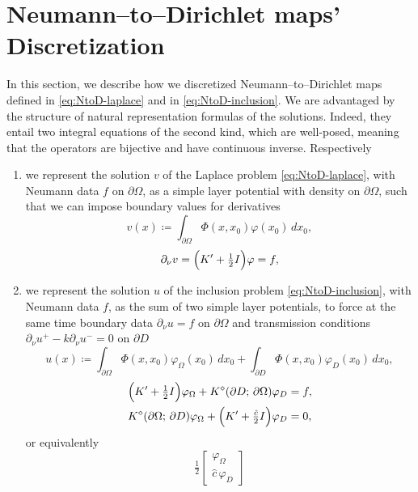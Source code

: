 \documentclass[10pt, a4paper, twoside, openright]{book}
\theoremstyle{definition}
\theoremstyle{plain}
\theoremstyle{plain}
\theoremstyle{plain}
\theoremstyle{plain}
\theoremstyle{plain}
\theoremstyle{plain}
\theoremstyle{plain}
\theoremstyle{plain}
\let\phi\varphi
\begin{document}
\section{Neumann--to--Dirichlet maps' Discretization}
In this section, we describe how we discretized Neumann--to--Dirichlet maps defined in 
\eqref{eq:NtoD-laplace} and in \eqref{eq:NtoD-inclusion}. We are advantaged by the 
structure of natural representation formulas of the solutions. Indeed, they entail two 
integral equations of the second kind, which are well-posed, meaning that the 
operators are bijective and have continuous inverse.
Respectively
\begin{enumerate}
 \item we represent the solution $v$ of the Laplace problem \eqref{eq:NtoD-laplace}, with 
 Neumann data $f$ on $\partial \Omega$, as a simple layer potential with density on $\partial \Omega$, such 
 that we can impose boundary values for derivatives
 \begin{equation}
 \label{eq:def-v-representation}
  v(x)\coloneqq \int_{\partial\Omega}\Phi(x,x_0)\phi(x_0)\,dx_0,
 \end{equation}
 \begin{equation}
 \label{eq:2kind-laplace}
  \partial_\nu v=\Bigl(K'+\tfrac{1}{2}I\Bigr)\phi = f,
 \end{equation}
 \item we represent the solution $u$ of the inclusion problem \eqref{eq:NtoD-inclusion}, 
 with Neumann data $f$, as the sum of two simple layer potentials, to force 
 at the same time boundary data $\partial_\nu u = f$ on $\partial \Omega$ and transmission conditions 
 $\partial_\nu u^+-k\partial_\nu u^-=0$ on $\partial D$
 \begin{equation}
 \label{eq:def-u-representation}
  u(x)\coloneqq \int_{\partial\Omega}\Phi(x,x_0)\phi_\Omega(x_0)\,dx_0 + \int_{\partial D}\Phi(x,x_0)\phi_D(x_0)\,dx_0,
 \end{equation}
 \begin{align}
  &\Bigl(K' + \tfrac{1}{2} I\Bigr)\phi_\Omega + K^\diamond(\partial D;\,\partial \Omega)\phi_D = f,\\
  & K^\diamond(\partial \Omega;\,\partial D)\phi_\Omega + \Bigl(K' + \tfrac{\hat{c}}{2} I\Bigr)\phi_D = 0,
 \end{align}
 or equivalently 
 \begin{equation}
 \label{eq:2kind-inclusion}
 \tfrac{1}{2}
 \begin{bmatrix}
  \phi_\Omega\\ \hat{c}\,\phi_D

\end{bmatrix}
\end{equation}
\end{enumerate}
\end{document}
